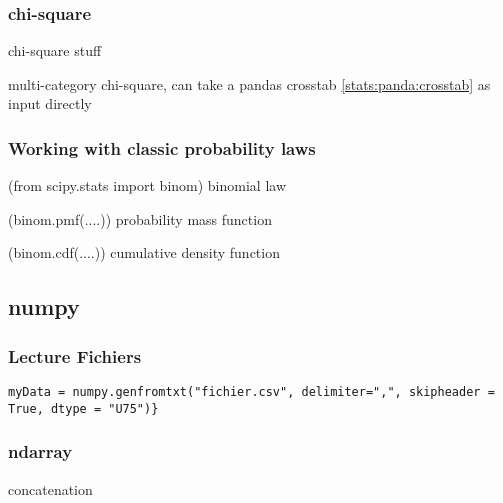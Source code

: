 



		\subsubsection{chi-square}

			 chi-square stuff

			 multi-category chi-square, can take a pandas crosstab \ref{stats:panda:crosstab} as input directly

		\subsubsection{Working with classic probability laws}

			\code(from scipy.stats import binom) binomial law

			\code(binom.pmf(....)) probability mass function

			\code(binom.cdf(....)) cumulative density function


	\subsection{numpy}

		\subsubsection{Lecture Fichiers}
			
\begin{lstlisting}
myData = numpy.genfromtxt("fichier.csv", delimiter=",", skipheader = True, dtype = "U75")}
\end{lstlisting}

		\subsubsection{ndarray}
			


			 concatenation

